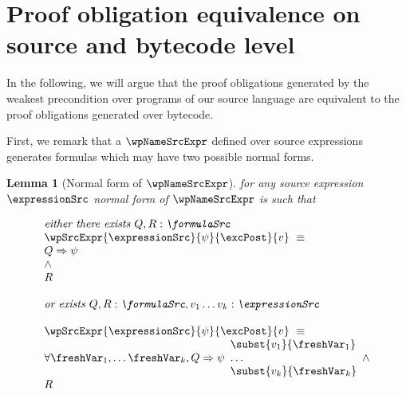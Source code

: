 

\newtheorem{wpExprSrc}{Lemma}[section]
\newtheorem{exprValueOnStack1}[wpExprSrc]{Lemma}
\newtheorem{exprSrcBcWp1}[wpExprSrc]{Lemma}
\newtheorem{exprSrcBcWp2}[wpExprSrc]{Lemma}
\newtheorem{wpStmtBcSrc1}[wpExprSrc]{Lemma}
\newtheorem{wpStmtBcSrc2}[wpExprSrc]{Lemma}


\section{Proof obligation equivalence on source and bytecode level}\label{pogEq:aux}

In the following, we will argue that the proof obligations generated by the weakest precondition
over programs of our source language are equivalent to the  proof obligations generated over bytecode.

First, we remark that a $\wpNameSrcExpr$ defined over source  expressions generates formulas which may
 have two possible normal forms.


\begin{wpExprSrc}[Normal form of $\wpNameSrcExpr$] \label{pogEq:aux:wpExprSrc}
for any source expression $\expressionSrc$ 
normal form of  $\wpNameSrcExpr$ is such that 

$$ \begin{array}{l}
         \mbox{\rm\textit{either  there exists $ Q,R:\formulaSrc $  }} \\
         \wpSrcExpr{\expressionSrc }{ \psi }{ \excPost}{v} \  \equiv \\ 
          Q \Rightarrow \psi \\
          \wedge \\ 
	  R \\\\
	  \mbox{\rm\textit{or exists $ Q,R:\formulaSrc, v_1 \ldots v_k :\expressionSrc $   }} \\
\\
 \wpSrcExpr{\expressionSrc }{ \psi }{ \excPost}{v} \  \equiv \\
      \forall \freshVar_1, \ldots  \freshVar_k   ,  Q \Rightarrow \psi 
                                                                             \begin{array}{l}
									        \subst{v_1 }{ \freshVar_1 }  \\
										\ldots \\
										\subst{v_k}{ \freshVar_k } 
									     \end{array}
          \wedge \\ 
	  R  
   \end{array}  $$ \\
\end{wpExprSrc}


